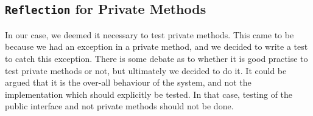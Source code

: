 
%
%
%


\subsection{\texttt{Reflection} for Private Methods}\label{sec:privTest}
In our case, we deemed it necessary to test private methods. This came to be because we had an exception in a private method, and we decided to write a test to catch this exception. There is some debate as to whether it is good practise to test private methods or not, but ultimately we decided to do it. It could be argued that it is the over-all behaviour of the system, and not the implementation which should explicitly be tested. In that case, testing of the public interface and not private methods should not be done.

% 